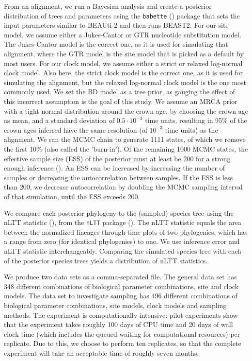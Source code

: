 \documentclass{article}
\begin{document}
From an alignment, we run a Bayesian analysis and 
create a posterior distribution of trees and parameters
using the \verb;babette; (\cite{babette}) package
that sets the input parameters similar to BEAUti 2 and then runs BEAST2. 
For our site model, we assume either a Jukes-Cantor or GTR nucleotide substitution model.
The Jukes-Cantor model is the correct one, as it is used for simulating that alignment,
where the GTR model is the site model that is picked as a default by most users.
For our clock model, we assume either a strict or relaxed log-normal 
clock model. 
Also here, the strict clock model is the correct one, as it is used for simulating the alignment,
but the relaxed log-normal clock model is the one most commonly used.
We set the BD model as a tree prior, 
as gauging the effect of this incorrect assumption is the goal of this study. 
We assume an MRCA prior with a tight normal distribution
around the crown age, by choosing the crown age as mean, and a standard deviation 
of $0.5 \cdot 10^{-3}$ time units,
resulting in 95\% of the crown ages inferred have the same resolution (of $10^{-3}$ time 
units) as the alignment. 
We ran the MCMC chain to generate 1111 states,
of which we remove the first 10\% (also called the 'burn-in'). 
Of the remaining
1000 MCMC states, the effective sample size (ESS) of the posterior 
must at least be 200
for a strong enough inference (\cite{beastbook}). An ESS can be increased by increasing
the number of samples or decreasing the autocorrelation between samples. 
If the ESS is less than 200, we decrease autocorrelation by doubling 
the MCMC sampling interval of that simulation, until the ESS exceeds 200.

We compare each posterior phylogeny to the (sampled) species tree
using the nLTT statistic (\cite{janzen2015}), from the \verb;nLTT; package (\cite{nltt}). 
The nLTT statistic equals the area between the normalized
lineages-through-time-plots of two phylogenies, which has a range 
from zero (for identical phylogenies) to one. We use inference error 
and nLTT statistic interchangeably. Comparing the simulated species tree
with each of the posterior species trees yields a distribution of nLTT statistics. 

We produce two data sets as a comma-separated file.
The general data set has 348 different combinations
of biological parameter combinations, site and clock models.
The data set to investigate sampling has 496 different combinations
of biological parameter combinations, site models, clock models 
and sampling methods. The experiment is computationally intensive:
pilot experiments show that the experiment takes roughly 100 days
of CPU time and 20 days of wall clock time (which includes the queued 
waiting for computational resources) per replicate. 
Due to this, we choose to perform ten replicates, so that the complete
experiment will take an acceptable time of roughly seven months. 
\end{document}
